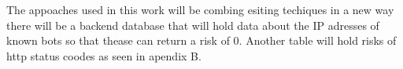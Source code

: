 The appoaches used in this work will be combing esiting techiques in a new way there will be a backend database that will hold data about the IP adresses of known bots so that thease can return a risk of 0. Another table will hold risks of http status coodes as  seen in apendix B.